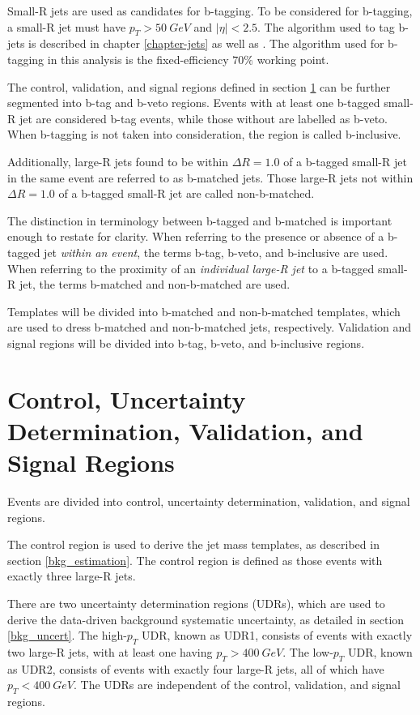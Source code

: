 Small-R jets are used as candidates for b-tagging. To be considered for b-tagging, a small-R jet
must have $p_{T}>50~GeV$ and $|\eta|<2.5$. The algorithm used to tag
b-jets is described in chapter \ref{chapter-jets} as well as
\cite{b-jet-perf-1, b-jet-perf-2}. The algorithm used for b-tagging in
this analysis is the fixed-efficiency $70\%$ working point.

The control, validation, and signal regions defined in section
\ref{region_defs} can be further segmented into b-tag and b-veto
regions. Events with at least one b-tagged small-R jet are considered
b-tag events, while those without are labelled as b-veto. When
b-tagging is not taken into consideration, the region is called
b-inclusive.

Additionally, large-R jets found to be within $\Delta R=1.0$ of a
b-tagged small-R jet in the same event are referred to as b-matched
jets. Those large-R jets not within $\Delta R=1.0$ of a b-tagged
small-R jet are called non-b-matched. 

The distinction in terminology between b-tagged and b-matched is important enough to
restate for clarity. When referring to the presence or absence of a b-tagged
jet \textit{within an event}, the terms b-tag, b-veto, and b-inclusive are used. When
referring to the proximity of an \textit{individual large-R jet} to a b-tagged
small-R jet, the terms b-matched and non-b-matched are used.

Templates will be divided into b-matched and non-b-matched templates,
which are used to dress b-matched and non-b-matched jets,
respectively. Validation and signal regions will be divided into
b-tag, b-veto, and b-inclusive regions.

\section{Control, Uncertainty Determination, Validation, and Signal Regions} \label{region_defs}
Events are divided into control, uncertainty determination,
validation, and signal regions.

The control region is used to derive the jet mass templates, as
described in section \ref{bkg_estimation}. The control region is
defined as those events with exactly three large-R jets. 

There are two uncertainty determination regions (UDRs), which are used to
derive the data-driven background systematic uncertainty, as detailed
in section \ref{bkg_uncert}. The high-$p_{T}$ UDR, known as UDR1,
consists of events with exactly two large-R jets, with at least one
having $p_{T}>400~GeV$. The low-$p_{T}$ UDR, known as UDR2, consists
of events with exactly four large-R jets, all of which have
$p_{T}<400~GeV$. The UDRs are independent of the control, validation,
and signal regions.

